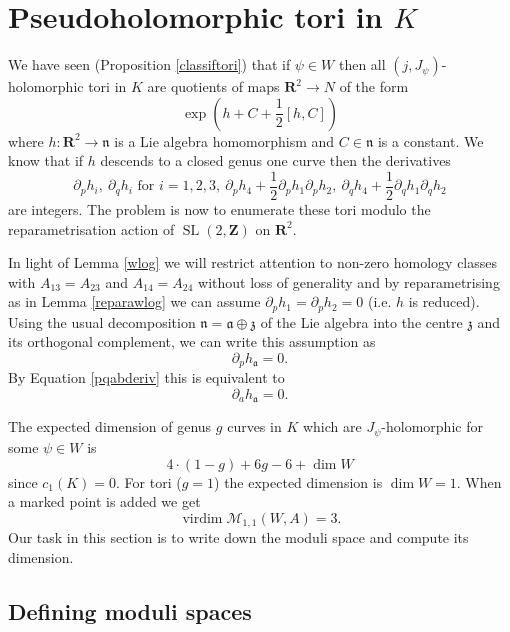 \documentclass[11pt]{amsart}
\newcommand{\mM}{\mathcal{M}}
\newcommand{\RR}{\mathbf{R}}
\newcommand{\ZZ}{\mathbf{Z}}
\newcommand{\WW}{W}
\newcommand{\nn}{\mathfrak{n}}
\renewcommand{\aa}{\mathfrak{a}}
\newcommand{\zz}{\mathfrak{z}}
\newcommand{\OP}{\operatorname}
\numberwithin{equation}{section}
\theoremstyle{definition}
\theoremstyle{remark}
\begin{document}

\section{Pseudoholomorphic tori in $K$}\label{holtor}


We have seen (Proposition \ref{classiftori}) that if $\psi\in\WW$ then all $(j,J_{\psi})$-holomorphic tori in $K$ are quotients of maps $\RR^2\to N$ of the form
\begin{equation}\label{pseudotor}
\exp\left(h+C+\frac{1}{2}[h,C]\right)
\end{equation}
where $h\colon\RR^2\to\nn$ is a Lie algebra homomorphism and $C\in\nn$ is a constant. We know that if $h$ descends to a closed genus one curve then the derivatives
\[\partial_ph_i,\ \partial_qh_i\mbox{ for }i=1,2,3,\ \partial_ph_4+\frac{1}{2}\partial_ph_1\partial_ph_2,\ \partial_qh_4+\frac{1}{2}\partial_qh_1\partial_qh_2\]
are integers. The problem is now to enumerate these tori modulo the repara\-met\-ris\-ation action of $\OP{SL}(2,\ZZ)$ on $\RR^2$.

In light of Lemma \ref{wlog} we will restrict attention to non-zero homology classes with $A_{13}=A_{23}$ and $A_{14}=A_{24}$ without loss of generality and by reparametrising as in Lemma \ref{reparawlog} we can assume $\partial_ph_1=\partial_ph_2=0$ (i.e. $h$ is reduced). Using the usual decomposition $\nn=\aa\oplus\zz$ of the Lie algebra into the centre $\zz$ and its orthogonal complement, we can write this assumption as
\[\partial_ph_{\aa}=0.\]
By Equation \eqref{pqabderiv} this is equivalent to
\[\partial_ah_{\aa}=0.\]

The expected dimension of genus $g$ curves in $K$ which are $J_{\psi}$-holomorphic for some $\psi\in\WW$ is
\[4\cdot(1-g)+6g-6+\dim\WW\]
since $c_1(K)=0$. For tori ($g=1$) the expected dimension is $\dim\WW=1$. When a marked point is added we get
\[\OP{virdim}\mM_{1,1}(\WW,A)=3.\]
Our task in this section is to write down the moduli space and compute its dimension.

\subsection{Defining moduli spaces}
\end{document}
